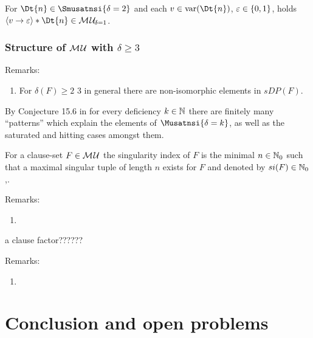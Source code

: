 \documentclass{report}
\begin{document}
For $\Dt{n} \in \Smusatnsi{\delta=2}$ and each $v \in \var(\Dt{n})$, $\varepsilon \in \{ 0,1 \}$, holds $\pao v{\ve} * \Dt{n} \in \Musati{\delta=1}$.
\subsection{Structure of $\mathcal{M\hspace{0.8pt}U}$ with $\delta \ge 3$}
\label{sec:smu3}


Remarks:
  \begin{enumerate}
  \item For $\delta(F) \ge 2$ 3 in general there are non-isomorphic elements in $sDP(F)$.
  \end{enumerate}


\begin{conj}\label{con:mudelta}
By Conjecture 15.6 in \cite{h9} for every deficiency $k \in \mathbb{N}$ there are finitely many ``patterns'' which explain the elements of $\Musatnsi{\delta=k}$, as well as the saturated and hitting cases amongst them.
\end{conj}


\begin{defi}\label{def:sing-indx}
\cite{h29} For a clause-set $F \in \mathcal{M\hspace{0.8pt}U}$ the singularity index of $F$ is the minimal $n \in \mathbb{N}_0$ such that a maximal singular tuple of length $n$ exists for $F$ and denoted by $si(F) \in \mathbb{N}_0$,.
\end{defi}
Remarks:
  \begin{enumerate}
  \item
  \end{enumerate}
\begin{defi}\label{def:cl-factor}
\cite {h26} a clause factor??????
\end{defi}
Remarks:
  \begin{enumerate}
  \item 
  \end{enumerate}
\chapter{Conclusion and open problems}
\label{cha:concl}

\newpage


\end{document}
